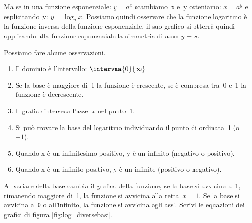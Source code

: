 Ma se in una funzione esponenziale: \(y=a^x\) scambiamo~x e~y 
otteniamo: \(x=a^y\) e esplicitando~y: \(y=\log_a x\). Possiamo quindi 
osservare che la funzione logaritmo è la funzione inversa della funzione 
esponenziale. il suo grafico si otterrà quindi applicando alla funzione 
esponenziale la simmetria di asse: \(y=x\).

\noindent
\begin{minipage}[]{.48\textwidth}
\begin{center}
\begin{inaccessibleblock}[Grafico di una funzione esponenziale e 
il suo simmetrico rispetto a y=x]
  \graficologaritmica
\end{inaccessibleblock}
\end{center}
\end{minipage} \hspace{.04\textwidth}
\begin{minipage}[]{.48\textwidth}
Possiamo fare alcune osservazioni.
\begin{enumerate}
 \item Il dominio è l'intervallo: \(\intervaa{0}{\infty}\)
 \item Se la base è maggiore di~1 la funzione è crescente, 
 se è compresa tra~0 e~1 la funzione è decrescente.
 \item Il grafico interseca l'asse~\(x\) nel punto~1.
 \item Si può trovare la base del logaritmo individuando il punto di 
 ordinata~1 (o~\(-1\)).
 \item Quando x è un infinitesimo positivo, y è un infinito (negativo o 
positivo).
 \item Quando x è un infinito positivo, y è un infinito (positivo o negativo).
\end{enumerate}

\end{minipage} 
\vspace{12pt}

Al variare della base cambia il grafico della funzione, 
se la base si avvicina a~1, rimanendo maggiore di~1, la funzione si avvicina 
alla retta~\(x=1\). 
Se la base si avvicina a~0 o all'infinito, la funzione si avvicina agli assi.
Scrivi le equazioni dei grafici di figura \ref{fig:log_diversebasi}.

